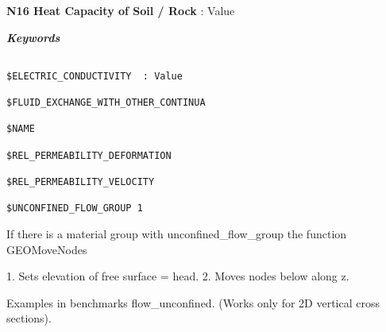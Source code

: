\vspace{5mm}

 \textbf{N16 Heat Capacity of Soil / Rock }: Value

\vspace{5mm}

\newpage

 \emph{\emph{\textbf{Keywords}}}

\begin{verbatim}

$ELECTRIC_CONDUCTIVITY  : Value

$FLUID_EXCHANGE_WITH_OTHER_CONTINUA

$NAME

$REL_PERMEABILITY_DEFORMATION

$REL_PERMEABILITY_VELOCITY

$UNCONFINED_FLOW_GROUP 1
\end{verbatim}

If there is a material group with unconfined\_flow\_group the
function GEOMoveNodes

   1. Sets elevation of free surface = head.
   2. Moves nodes below along z.

Examples in benchmarks flow\_unconfined. (Works only for 2D
vertical cross sections).


\newpage
